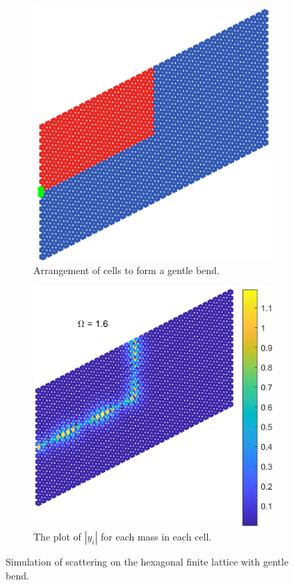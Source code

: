 \begin{figure}
\centering
\begin{subfigure}[b]{.5\textwidth}
  \centering
  \includegraphics[width=0.8\linewidth]{imgs/gentlebendarr.png}
  \caption{Arrangement of cells to form a gentle bend.}
  \label{fig:sub1}
\end{subfigure}%
\begin{subfigure}[b]{.5\textwidth}
  \centering
  \includegraphics[width=1\linewidth]{imgs/gentlebendscat.png}
  \caption{The plot of $|y_i|$ for each mass in each cell.}
  \label{fig:sub2}
\end{subfigure}
\caption{Simulation of scattering on the hexagonal finite lattice with gentle
  bend.}
\label{fig:gentlebend}
\end{figure}

